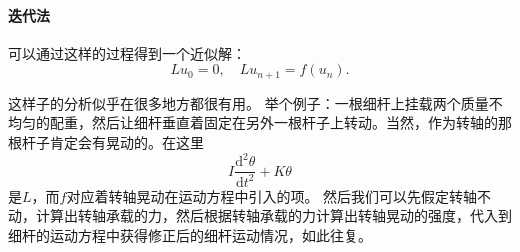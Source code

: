 \documentclass[UTF8, a4paper]{ctexart}
\begin{document}
\paragraph{迭代法}可以通过这样的过程得到一个近似解：
\begin{equation}
    Lu_0 = 0, \quad Lu_{n+1} = f(u_n).
\end{equation}

这样子的分析似乎在很多地方都很有用。
举个例子：一根细杆上挂载两个质量不均匀的配重，然后让细杆垂直着固定在另外一根杆子上转动。当然，作为转轴的那根杆子肯定会有晃动的。在这里
\[
    I\frac{\mathrm{d}^2\theta}{\mathrm{d}t^2} + K \theta 
\]
是$L$，而$f$对应着转轴晃动在运动方程中引入的项。
然后我们可以先假定转轴不动，计算出转轴承载的力，然后根据转轴承载的力计算出转轴晃动的强度，代入到细杆的运动方程中获得修正后的细杆运动情况，如此往复。
\end{document}
